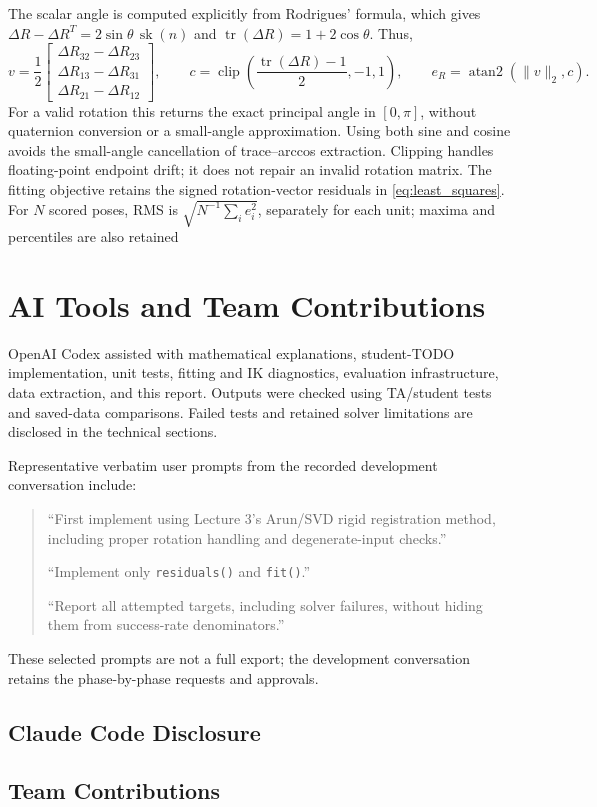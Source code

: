 \documentclass[11pt,letterpaper]{article}
\begin{document}
The scalar angle is computed explicitly from Rodrigues' formula, which gives $\Delta R-\Delta R^T=2\sin\theta\,\operatorname{sk}(n)$ and $\operatorname{tr}(\Delta R)=1+2\cos\theta$. Thus,
\begin{equation*}
v=\frac12
\begin{bmatrix}
\Delta R_{32}-\Delta R_{23}\\
\Delta R_{13}-\Delta R_{31}\\
\Delta R_{21}-\Delta R_{12}
\end{bmatrix},
\qquad
c=\operatorname{clip}\!\left(
\frac{\operatorname{tr}(\Delta R)-1}{2},-1,1\right),
\qquad
e_R=\operatorname{atan2}(\|v\|_2,c).
\end{equation*}
For a valid rotation this returns the exact principal angle in $[0,\pi]$, without quaternion conversion or a small-angle approximation. Using both sine and cosine avoids the small-angle cancellation of trace--arccos extraction. Clipping handles floating-point endpoint drift; it does not repair an invalid rotation matrix. The fitting objective retains the signed rotation-vector residuals in \cref{eq:least_squares}. For $N$ scored poses, RMS is $\sqrt{N^{-1}\sum_i e_i^2}$, separately for each unit; maxima and percentiles are also retained

\section{AI Tools and Team Contributions}\label{app:ai}
OpenAI Codex assisted with mathematical explanations, student-TODO implementation, unit tests, fitting and IK diagnostics, evaluation infrastructure, data extraction, and this report. Outputs were checked using TA/student tests and saved-data comparisons. Failed tests and retained solver limitations are disclosed in the technical sections.

Representative verbatim user prompts from the recorded development conversation include:
\begin{quote}\small
``First implement  using Lecture 3's Arun/SVD rigid registration method, including proper rotation handling and degenerate-input checks.''

``Implement only \texttt{residuals()} and \texttt{fit()}.''

``Report all attempted targets, including solver failures, without hiding them from success-rate denominators.''
\end{quote}
These selected prompts are not a full export; the development conversation retains the phase-by-phase requests and approvals.

\subsection*{Claude Code Disclosure}
\vspace{2\baselineskip}

\subsection*{Team Contributions}\label{app:team}
\vspace{2\baselineskip}
\end{document}
